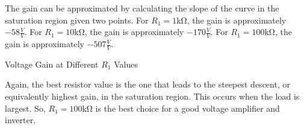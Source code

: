 \FloatBarrier

The gain can be approximated by calculating the slope of the curve in the saturation region given two points. For $R_1 = 1$\si{\kilo\ohm}, the gain is approximately $-58 \frac{V}{V}$. For $R_1 = 10$\si{\kilo\ohm}, the gain is approximately $-170 \frac{V}{V}$. For $R_1 = 100$\si{\kilo\ohm}, the gain is approximately $-507 \frac{V}{V}$. \\

\FloatBarrier

\begin{table}[h!]
	\centering
	\caption{Voltage Gain at Different $R_1$ Values}
	\label{tab:gain}
\end{table}

\FloatBarrier

Again, the best resistor value is the one that leads to the steepest descent, or equivalently highest gain, in the saturation region. This occurs when the load is largest. So, $R_1 = 100$\si{\kilo\ohm} is the best choice for a good voltage amplifier and inverter. \\
